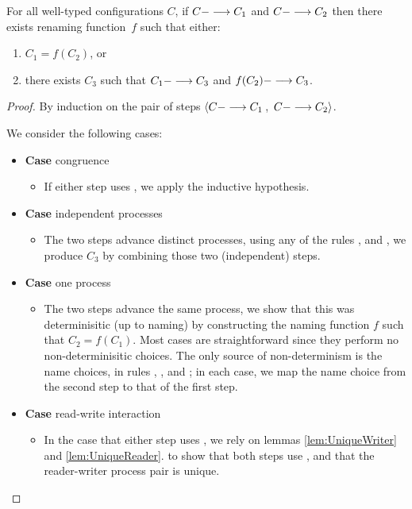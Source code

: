 \begin{theorem}
For all well-typed configurations $C$,
%
 if $C ---> C_1$ 
and $C ---> C_2$ 
then 
there exists renaming function~$f$ 
such that either:
\begin{enumerate}
\item %
$C_1 = f(C_2)$,
or
\item there exists $C_3$ such that $C_1 ---> C_3$ and $f(C_2) ---> C_3$.
\end{enumerate}
\begin{proof}
   By induction on the pair of steps 
   $\left< C ---> C_1\right.$, 
   $\left.C ---> C_2 \right>$.

   We consider the following cases:
   \begin{itemize}[leftmargin=*]
   \item[] \textbf{Case} congruence
     \begin{itemize}[leftmargin=*]
       \item[] If either step uses , we apply
     the inductive hypothesis.
     \end{itemize}     

   \item[] \textbf{Case} independent processes
     \begin{itemize}[leftmargin=*]
       \item[] The two steps advance distinct processes, using any of the rules
         ,  and , we produce $C_3$ by combining
         those two (independent) steps.
     \end{itemize}


   \item[] \textbf{Case} one process
     \begin{itemize}[leftmargin=*]
       \item[] The two steps advance the same process, we show that this was
         determinisitic (up to naming) by constructing the naming function $f$
         such that $C_2 = f(C_1)$.  Most cases are straightforward since they
         perform no non-determinisitic choices.  The only source of
         non-determinism is the name choices, in rules , ,
         and ; in each case, we map the name choice from the second
         step to that of the first step.
     \end{itemize}


   \item[] \textbf{Case} read-write interaction
     \begin{itemize}[leftmargin=*]
       \item[] In the case that either step uses , we rely on lemmas
         \ref{lem:UniqueWriter} and \ref{lem:UniqueReader}.  to show that both
         steps use , and that the reader-writer process pair is unique.
     \end{itemize}
   \end{itemize}
\end{proof}
\end{theorem}

